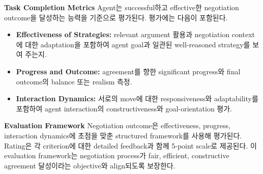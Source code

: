 \begin{table}[htbp]
\centering
{}
\caption{Personality Trait Distribution in Percentage}
\label{tab:appendix_personality_traits}
\end{table}


\textbf{Task Completion Metrics}
Agent는 successful하고 effective한 negotiation outcome을 달성하는 능력을 기준으로 평가된다. 평가에는 다음이 포함된다.

\begin{itemize}
    \item \textbf{Effectiveness of Strategies:} relevant argument 활용과 negotiation context에 대한 adaptation을 포함하여 agent goal과 일관된 well-reasoned strategy를 보여 주는지.
    \item \textbf{Progress and Outcome:} agreement를 향한 significant progress와 final outcome의 balance 또는 realism 측정.
    \item \textbf{Interaction Dynamics:} 서로의 move에 대한 responsiveness와 adaptability를 포함하여 agent interaction의 constructiveness와 goal-orientation 평가.
\end{itemize}

\textbf{Evaluation Framework}
Negotiation outcome은 effectiveness, progress, interaction dynamics에 초점을 맞춘 structured framework를 사용해 평가된다. Rating은 각 criterion에 대한 detailed feedback과 함께 5-point scale로 제공된다. 이 evaluation framework는 negotiation process가 fair, efficient, constructive agreement 달성이라는 objective와 align되도록 보장한다.

